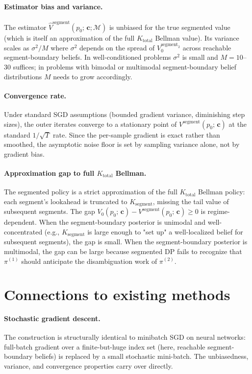 \documentclass[11pt,a4paper]{article}
\newcommand{\bc}{\bm{c}}
\begin{document}
\paragraph{Estimator bias and variance.}  The estimator
$\widehat{V}^\mathrm{segment}(p_0;\, \bc; \mathcal{M})$ is unbiased for the true segmented
value (which is itself an approximation of the full $K_\mathrm{total}$ Bellman value).
Its variance scales as $\sigma^2 / M$ where $\sigma^2$ depends on the spread of
$V_0^{\mathrm{segment}_2}$ across reachable segment-boundary beliefs.  In well-conditioned
problems $\sigma^2$ is small and $M = 10$--$30$ suffices; in problems with bimodal or
multimodal segment-boundary belief distributions $M$ needs to grow accordingly.

\paragraph{Convergence rate.}  Under standard SGD assumptions (bounded gradient variance,
diminishing step sizes), the outer iterates converge to a stationary point of
$V^\mathrm{segment}(p_0;\, \bc)$ at the standard $1/\sqrt{T}$ rate.  Since the per-sample
gradient is exact rather than smoothed, the asymptotic noise floor is set by sampling
variance alone, not by gradient bias.

\paragraph{Approximation gap to full $K_\mathrm{total}$ Bellman.}  The segmented policy is a
strict approximation of the full $K_\mathrm{total}$ Bellman policy: each segment's lookahead
is truncated to $K_\mathrm{segment}$, missing the tail value of subsequent segments.  The gap
$V_0(p_0;\, \bc) - V^\mathrm{segment}(p_0;\, \bc) \ge 0$ is regime-dependent.  When the
segment-boundary posterior is unimodal and well-concentrated (e.g., $K_\mathrm{segment}$ is
large enough to "set up" a well-localized belief for subsequent segments), the gap is small.
When the segment-boundary posterior is multimodal, the gap can be large because segmented DP
fails to recognize that $\pi^{(1)}$ should anticipate the disambiguation work of $\pi^{(2)}$.

\section{Connections to existing methods}
\label{sec:related}

\paragraph{Stochastic gradient descent.}  The construction is structurally identical to
minibatch SGD on neural networks: full-batch gradient over a finite-but-huge index set
(here, reachable segment-boundary beliefs) is replaced by a small stochastic mini-batch.  The
unbiasedness, variance, and convergence properties carry over directly.
\end{document}
